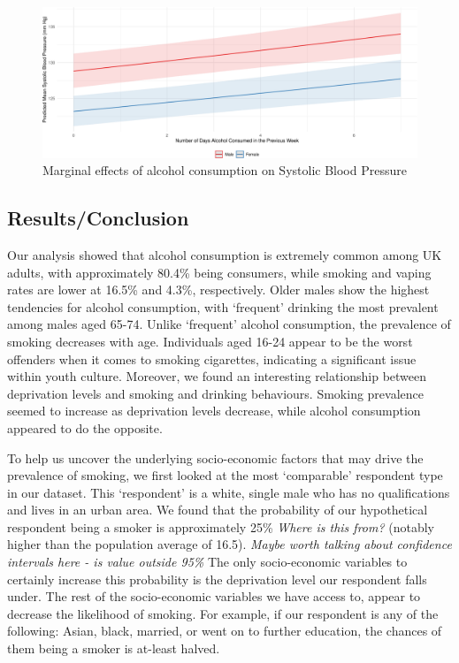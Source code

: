 \documentclass[
  11pt,
  twocolumn]{article}
\begin{document}
\begin{figure}[H]
\includegraphics{Coursework_files/figure-latex/output-effect-plots-alc-1} \caption{Marginal effects of alcohol consumption on Systolic Blood Pressure}\label{fig:output-effect-plots-alc}
\end{figure}

\subsection{Results/Conclusion}\label{resultsconclusion}

Our analysis showed that alcohol consumption is extremely common among
UK adults, with approximately 80.4\% being consumers, while smoking and
vaping rates are lower at 16.5\% and 4.3\%, respectively. Older males
show the highest tendencies for alcohol consumption, with `frequent'
drinking the most prevalent among males aged 65-74. Unlike `frequent'
alcohol consumption, the prevalence of smoking decreases with age.
Individuals aged 16-24 appear to be the worst offenders when it comes to
smoking cigarettes, indicating a significant issue within youth culture.
Moreover, we found an interesting relationship between deprivation
levels and smoking and drinking behaviours. Smoking prevalence seemed to
increase as deprivation levels decrease, while alcohol consumption
appeared to do the opposite.

To help us uncover the underlying socio-economic factors that may drive
the prevalence of smoking, we first looked at the most `comparable'
respondent type in our dataset. This `respondent' is a white, single
male who has no qualifications and lives in an urban area. We found that
the probability of our hypothetical respondent being a smoker is
approximately 25\% \emph{Where is this from?} (notably higher than the
population average of 16.5). \emph{Maybe worth talking about confidence
intervals here - is value outside 95\%} The only socio-economic
variables to certainly increase this probability is the deprivation
level our respondent falls under. The rest of the socio-economic
variables we have access to, appear to decrease the likelihood of
smoking. For example, if our respondent is any of the following: Asian,
black, married, or went on to further education, the chances of them
being a smoker is at-least halved.
\end{document}
